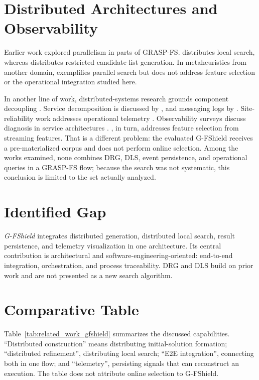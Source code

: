 \section{Distributed Architectures and Observability}

Earlier work explored parallelism in parts of GRASP-FS.  distributes local search, whereas  distributes restricted-candidate-list generation. In metaheuristics from another domain,  exemplifies parallel search but does not address feature selection or the operational integration studied here.

In another line of work, distributed-systems research grounds component decoupling \cite{Tanenbaum2007Distributed}. Service decomposition is discussed by , and messaging logs by . Site-reliability work addresses operational telemetry \cite{beyer2016site,mateus2021security}. Observability surveys discuss diagnosis in service architectures \cite{usman2022observabilitysurvey,Faseeha2025MicroservicesObs}. , in turn, addresses feature selection from streaming features. That is a different problem: the evaluated G-FShield receives a pre-materialized corpus and does not perform online selection. Among the works examined, none combines DRG, DLS, event persistence, and operational queries in a GRASP-FS flow; because the search was not systematic, this conclusion is limited to the set actually analyzed.

\section{Identified Gap}

\textit{G-FShield} integrates distributed generation, distributed local search, result persistence, and telemetry visualization in one architecture. Its central contribution is architectural and software-engineering-oriented: end-to-end integration, orchestration, and process traceability. DRG and DLS build on prior work and are not presented as a new search algorithm.

\section{Comparative Table}

Table~\ref{tab:related_work_gfshield} summarizes the discussed capabilities. ``Distributed construction'' means distributing initial-solution formation; ``distributed refinement'', distributing local search; ``E2E integration'', connecting both in one flow; and ``telemetry'', persisting signals that can reconstruct an execution. The table does not attribute online selection to G-FShield.

